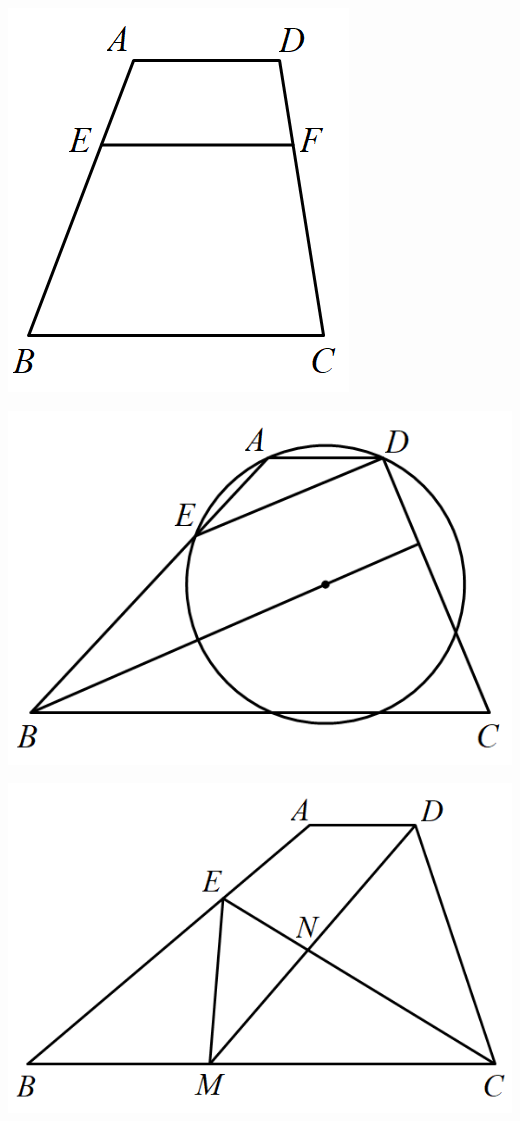 \documentclass{article}
\begin{document}
\noindent\begin{minipage}[b]{.24\textwidth}
    \centering
    \vspace{-2ex}
    \includegraphics[scale=0.3]{images/p7.png}
\end{minipage}
\begin{minipage}[b]{.38\textwidth}
    \centering
    \vspace{-2ex}
    \includegraphics[scale=0.3]{images/p8.png}
\end{minipage}
\begin{minipage}[b]{.38\textwidth}
    \centering
    \vspace{-2ex}
    \includegraphics[scale=0.3]{images/p9.png}
\end{minipage}
\end{document}
